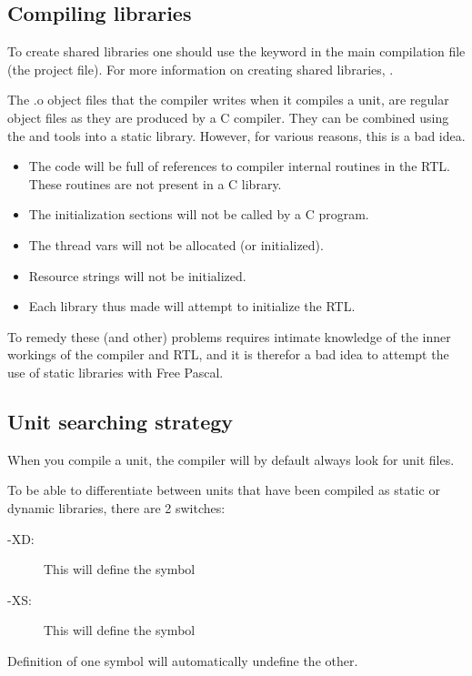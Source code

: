\subsection {Compiling libraries}
To create shared libraries one should use the  keyword in the
main compilation file (the project file). 
For more information on creating shared libraries, .

The .o object files that the compiler writes when it compiles a unit, 
are regular object files as they are produced by a C compiler. 
They can be combined using the  and  tools into 
a static library. However, for various reasons, this is a bad idea.
\begin{itemize}
\item The code will be full of references to compiler internal routines in
the RTL. These routines are not present in a C library.
\item The initialization sections will not be called by a C program.
\item The thread vars will not be allocated (or initialized).
\item Resource strings will not be initialized.
\item Each library thus made will attempt to initialize the RTL. 
\end{itemize}
To remedy these (and other) problems requires intimate knowledge of the
inner workings of the compiler and RTL, and it is therefor a bad idea to
attempt the use of static libraries with Free Pascal.

\subsection{Unit searching strategy}

When you compile a unit, the compiler will by
default always look for unit files.

To be able to differentiate between units that have been compiled as static
or dynamic libraries, there are 2 switches:

\begin{description}
\item [-XD:\ ] This will define the symbol 
\item [-XS:\ ] This will define the symbol 
\end{description}
Definition of one symbol will automatically undefine the other.

